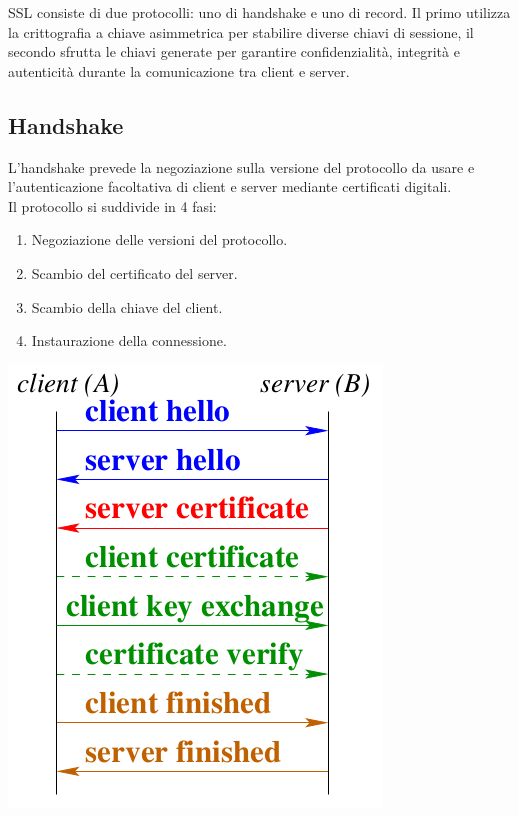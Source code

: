 \documentclass[a4paper, 11pt, twoside, openright, fleqn]{report}
\begin{document}
SSL consiste di due protocolli: uno di handshake e uno di record. Il primo utilizza la crittografia a chiave asimmetrica per stabilire diverse chiavi di sessione, il secondo sfrutta le chiavi generate per garantire confidenzialità, integrità e autenticità durante la comunicazione tra client e server.

\subsection{Handshake}
\begin{minipage}{.65\textwidth}
	L'handshake prevede la negoziazione sulla versione del protocollo da usare e l'autenticazione facoltativa di client e server mediante certificati digitali.\\
	Il protocollo si suddivide in 4 fasi:
	\begin{enumerate}
		\item Negoziazione delle versioni del protocollo.
		\item Scambio del certificato del server.
		\item Scambio della chiave del client.
		\item Instaurazione della connessione.
	\end{enumerate}
\end{minipage}
\begin{minipage}{.35\textwidth}
	\centering
	\includegraphics[width=.95\textwidth]{images/SSL}
\end{minipage}
\end{document}

